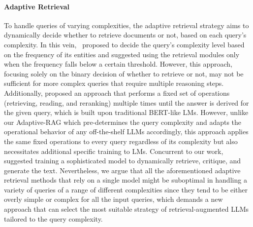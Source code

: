 \paragraph{Adaptive Retrieval}
To handle queries of varying complexities, the adaptive retrieval strategy aims to dynamically decide whether to retrieve documents or not, based on each query's complexity.
In this vein,~\citet{adaptiveRetrieval} proposed to decide the query's complexity level based on the frequency of its entities and suggested using the retrieval modules only when the frequency falls below a certain threshold. However, this approach, focusing solely on the binary decision of whether to retrieve or not, may not be sufficient for more complex queries that require multiple reasoning steps.
Additionally, \citet{DBLP:conf/emnlp/0003LSM21} proposed an approach that performs a fixed set of operations (retrieving, reading, and reranking) multiple times until the answer is derived for the given query, which is built upon traditional BERT-like LMs. However, unlike our Adaptive-RAG which pre-determines the query complexity and adapts the operational behavior of any off-the-shelf LLMs accordingly, this approach applies the same fixed operations to every query regardless of its complexity but also necessitates additional specific training to LMs. Concurrent to our work,~\citet{self-rag} suggested training a sophisticated model to dynamically retrieve, critique, and generate the text. Nevertheless, we argue that all the aforementioned adaptive retrieval methods that rely on a single model might be suboptimal in handling a variety of queries of a range of different complexities since they tend to be either overly simple or complex for all the input queries, which demands a new approach that can select the most suitable strategy of retrieval-augmented LLMs tailored to the query complexity.
